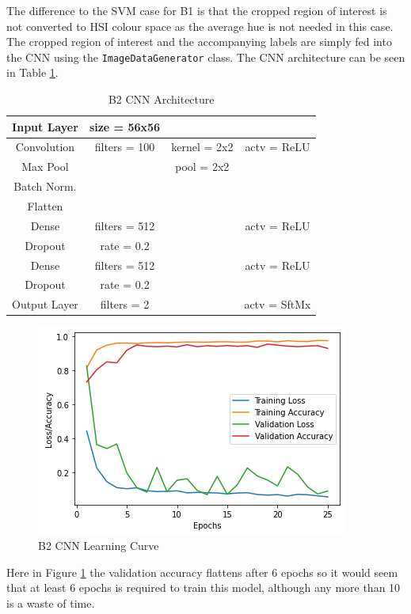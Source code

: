 \documentclass{article}
\begin{document}
	The difference to the SVM case for B1 is that the cropped region of interest is not converted to HSI colour space as the average hue is not needed in this case. The cropped region of interest and the accompanying labels are simply fed into the CNN using the \verb|ImageDataGenerator| class. The CNN architecture can be seen in Table \ref{table:B2_Arch}.
 	\begin{table}[]
	\begin{tabular}{|c|c c c|}
		\hline
		Input Layer & size = 56x56 	&				&	\\
		\hline
		Convolution & filters = 100 & kernel = 2x2 	& actv = ReLU\\
		\hline
		Max Pool	&				& pool = 2x2  	& \\
		\hline
		Batch Norm. & 				&				&\\
		\hline
		Flatten 	& 				& 				&\\
		\hline
		Dense 		&filters = 512 &				& actv = ReLU\\
		\hline
		Dropout 	& rate = 0.2 	&	 			&\\
		\hline
		Dense 		& filters = 512 &				& actv = ReLU\\
		\hline
		Dropout 	& rate = 0.2 	& 				&\\
		\hline
		Output Layer& filters = 2 	&				&actv = SftMx\\
		\hline
	\end{tabular}
	\caption{B2 CNN Architecture}
	\label{table:B2_Arch}
\end{table}
\begin{figure}[htb]
	\centering
	\includegraphics[scale=0.7]{Figures/B2_CNN_Graph.PNG}
	\caption{B2 CNN Learning Curve}
	\label{fig:B2_curve}
\end{figure}
	Here in Figure \ref{fig:B2_curve} the validation accuracy flattens after 6 epochs so it would seem that at least 6 epochs is required to train this model, although any more than 10 is a waste of time. 	
\end{document}
